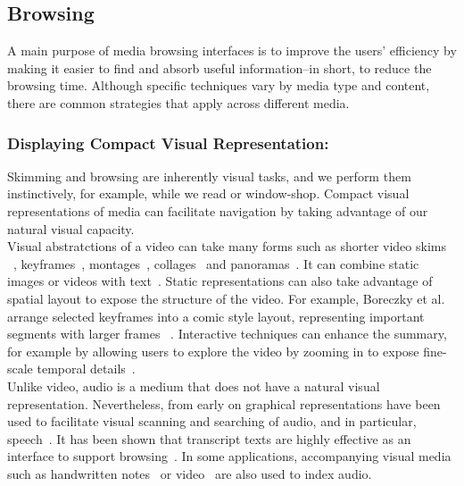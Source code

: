 \subsection{Browsing}
A main purpose of media browsing interfaces is to improve the users' efficiency by making it easier to find and absorb useful information--in short, to reduce the browsing time. Although specific techniques vary by media type and content, there are common strategies that apply across different media. \\

\subsubsection*{Displaying Compact Visual Representation:}
Skimming and browsing are inherently visual tasks, and we perform them instinctively, for example, while we read or window-shop. Compact visual representations of media can facilitate navigation by taking advantage of our natural visual capacity. \\

Visual abstratctions of a video can take many forms such as shorter video skims ~\cite{chu2015video,lu2013story}, keyframes~\cite{kim2014joint,khosla2013large}, montages~\cite{sun2014salient}, collages~\cite{wang2007video} and panoramas~\cite{liu2008discovering,choudary2007summarization}. It can combine static images or videos with text~\cite{papernick2005summarization}. Static representations can also take advantage of spatial layout to expose the structure of the video. For example, Boreczky et al. arrange selected keyframes into a comic style layout, representing important segments with larger frames~\cite{boreczky2000interactive} . Interactive techniques can enhance the summary, for example by allowing users to explore the video by zooming in to expose fine-scale temporal details~\cite{barnes2010video}.\\

Unlike video, audio is a medium that does not have a natural visual representation. Nevertheless, from early on graphical representations have been used to facilitate visual scanning and searching of audio, and in particular, speech~\cite{schmandt1981intelligent,degen1992working}. It has been shown that transcript texts are highly effective as an interface to support browsing~\cite{schmandt1981intelligent,whittaker1999scan}. In some applications, accompanying visual media such as handwritten notes~\cite{whittaker1994filochat,stifelman2001audio} or video~\cite{kazman1996four,hauptmann1997informedia} are also used to index audio.\\ 

